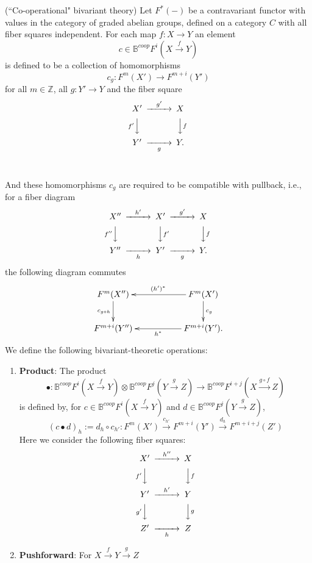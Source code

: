 \documentclass[a4paper]{amsart}
\begin{document}
\begin{thm}\label{coop-biv}(``Co-operational" bivariant theory)
Let $F^*(-)$ be a contravariant functor with values in the category of graded abelian groups, defined on a category $C$ with all fiber squares independent.
For each  
map $f:X \to Y$ an element
$$ c \in \mathbb B^{coop}F^i(X \xrightarrow f Y)$$
is defined to be a collection of 
homomorphisms
$$c_g: F^m(X') \to F^{m+i}(Y')$$
for all $m \in \mathbb Z$, all $g:Y' \to Y$  and the fiber square \, \, \, 
$$\CD
X' @> {g'}  >> X\\
@V {f'} VV @VV fV\\
Y' @>> {g} > Y.\\
\endCD
$$ \, \, \, 

And these homomorphisms $c_g$ are
required to be compatible with pullback, i.e., for a fiber diagram
\begin{equation}\label{cd-0}
\CD
X'' @> {h'}  >> X' @> {g'}  >> X\\
@V {f''} VV @VV f'V @VV fV\\
Y'' @>> {h} > Y' @>> {g} > Y.\\
\endCD
\end{equation}
the following diagram commutes
\begin{equation}\label{cd-01}
\xymatrix
{F^m(X'') \ar[d]_{c_{g \circ h}} && F^m(X')\ar[ll]_{(h')^*} \ar[d]^{c_g}\\
F^{m+i}(Y'') && F^{m+i}(Y') \ar[ll]^{h^*}.
}
\end{equation}
We define the following bivariant-theoretic operations:
\begin{enumerate}
\item {\bf Product}: The product
$$\bullet: \mathbb B^{coop}F^i(X \xrightarrow f Y) \otimes \mathbb B^{coop}F^j(Y \xrightarrow g Z) \to \mathbb B^{coop}F^{i+j}(X \xrightarrow {g \circ f} Z)$$
is defined by, for $c \in \mathbb B^{coop}F^i(X \xrightarrow f Y) $ and $d \in \mathbb B^{coop}F^j(Y \xrightarrow g Z) $,
$$(c \bullet d)_h:= d_h \circ c_{h'}: F^m(X') \xrightarrow {c_{h'}}  F^{m+i}(Y') \xrightarrow {d_h} F^{m+i+j}(Z')$$
Here we consider the following fiber squares:
\begin{equation}\label{cd-1}
\CD
X' @> {h''} >> X \\
@V {f'}VV @VV {f}V\\
Y' @> {h'} >> Y \\
@V {g'}VV @VV {g}V \\
Z'  @>> {h} > Z \endCD 
\end{equation}
\item {\bf Pushforward}: For $X \xrightarrow f Y \xrightarrow g Z$ 

\end{enumerate}
\end{thm}
\end{document}
